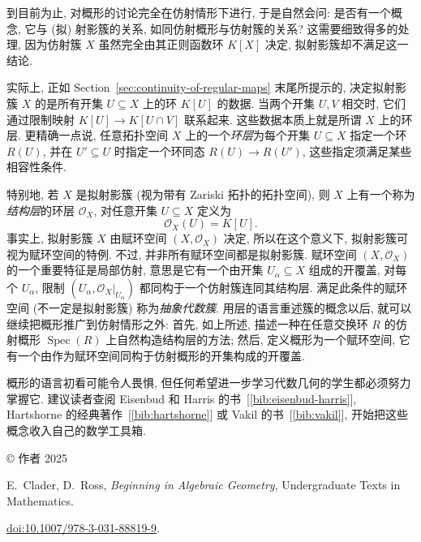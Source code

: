 到目前为止, 对概形的讨论完全在仿射情形下进行, 于是自然会问: 是否有一个概念, 它与 (拟) 射影簇的关系, 如同仿射概形与仿射簇的关系? 这需要细致得多的处理, 因为仿射簇 $X$ 虽然完全由其正则函数环 $K[X]$ 决定, 拟射影簇却不满足这一结论.

实际上, 正如 Section~\ref{sec:continuity-of-regular-maps} 末尾所提示的, 决定拟射影簇 $X$ 的是所有开集 $U\subseteq X$ 上的环 $K[U]$ 的数据. 当两个开集 $U,V$ 相交时, 它们通过限制映射 $K[U]\to K[U\cap V]$ 联系起来. 这些数据本质上就是所谓 $X$ 上的环层. 更精确一点说, 任意拓扑空间 $X$ 上的一个\emph{环层}为每个开集 $U\subseteq X$ 指定一个环 $R(U)$, 并在 $U'\subseteq U$ 时指定一个环同态 $R(U)\to R(U')$, 这些指定须满足某些相容性条件.

特别地, 若 $X$ 是拟射影簇 (视为带有 Zariski 拓扑的拓扑空间), 则 $X$ 上有一个称为\emph{结构层}的环层 $\mathcal{O}_{X}$, 对任意开集 $U\subseteq X$ 定义为
\[
  \mathcal{O}_{X}(U)=K[U].
\]
事实上, 拟射影簇 $X$ 由赋环空间 $(X,\mathcal{O}_{X})$ 决定, 所以在这个意义下, 拟射影簇可视为赋环空间的特例. 不过, 并非所有赋环空间都是拟射影簇. 赋环空间 $(X,\mathcal{O}_{X})$ 的一个重要特征是\textquotedbl{}局部仿射\textquotedbl{}, 意思是它有一个由开集 $U_{\alpha}\subseteq X$ 组成的开覆盖, 对每个 $U_{\alpha}$, 限制 $(U_{\alpha},\mathcal{O}_{X}|_{U_{\alpha}})$ 都同构于一个仿射簇连同其结构层. 满足此条件的赋环空间 (不一定是拟射影簇) 称为\emph{抽象代数簇}. 用层的语言重述簇的概念以后, 就可以继续把概形推广到仿射情形之外: 首先, 如上所述, 描述一种在任意交换环 $R$ 的仿射概形 $\operatorname{Spec}(R)$ 上自然构造结构层的方法; 然后, 定义概形为一个赋环空间, 它有一个由作为赋环空间同构于仿射概形的开集构成的开覆盖.

概形的语言初看可能令人畏惧, 但任何希望进一步学习代数几何的学生都必须努力掌握它. 建议读者查阅 Eisenbud 和 Harris 的书~[\ref{bib:eisenbud-harris}], Hartshorne 的经典著作~[\ref{bib:hartshorne}] 或 Vakil 的书~[\ref{bib:vakil}], 开始把这些概念收入自己的数学工具箱.

\par\medskip
{\footnotesize
\noindent © 作者 2025\par
\noindent E.\ Clader, D.\ Ross, \emph{Beginning in Algebraic Geometry}, Undergraduate Texts in Mathematics.\par
\noindent
\href{https://doi.org/10.1007/978-3-031-88819-9}{doi:10.1007/978-3-031-88819-9}.\par
}
